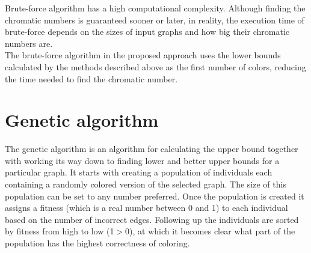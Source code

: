 \documentclass[a4paper]{report}
\begin{document}
		Brute-force algorithm has a high computational complexity. Although finding the chromatic numbers is guaranteed sooner or later, in reality, the execution time of brute-force depends on the sizes of input graphs and how big their chromatic numbers are.\\
		
		The brute-force algorithm in the proposed approach uses the lower bounds calculated by the methods described above as the first number of colors, reducing the time needed to find the chromatic number. \\
		
			
		\section{Genetic algorithm}
		The genetic algorithm is an algorithm for calculating the upper bound together with working its way down to finding lower and better upper bounds for a particular graph. It starts with creating a population of individuals each containing a randomly colored version of the selected graph. The size of this population can be set to any number preferred. Once the population is created it assigns a fitness (which is a real number between 0 and 1) to each individual based on the number of incorrect edges. Following up the individuals are sorted by fitness from high to low (1$>$0), at which it becomes clear what part of the population has the highest correctness of coloring.\\
		
\end{document}
